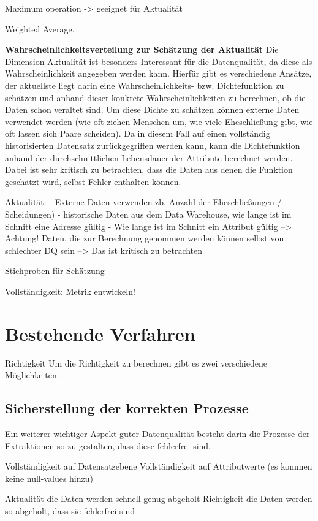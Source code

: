 Maximum operation
-> geeignet für Aktualität

Weighted Average. 

\textbf{Wahrscheinlichkeitsverteilung zur Schätzung der Aktualität}
Die Dimension Aktualität ist besonders Interessant für die Datenqualität, da diese als Wahrscheinlichkeit angegeben werden kann.
Hierfür gibt es verschiedene Ansätze, der aktuellste liegt darin eine Wahrscheinlichkeits- bzw. Dichtefunktion zu schätzen und anhand dieser konkrete Wahrscheinlichkeiten zu berechnen, ob die Daten schon veraltet sind.
Um diese Dichte zu schätzen können externe Daten verwendet werden (wie oft ziehen Menschen um, wie viele Eheschließung gibt, wie oft lassen sich Paare scheiden).
Da in diesem Fall auf einen vollständig historisierten Datensatz zurückgegriffen werden kann, kann die Dichtefunktion anhand der durchschnittlichen Lebensdauer der Attribute berechnet werden.
Dabei ist sehr kritisch zu betrachten, dass die Daten aus denen die Funktion geschätzt wird, selbst Fehler enthalten können. 

Aktualität:
- Externe Daten verwenden zb. Anzahl der Eheschließungen / Scheidungen) 
- historische Daten aus dem Data Warehouse, wie lange ist im Schnitt eine Adresse gültig
- Wie lange ist im Schnitt ein Attribut gültig
--> Achtung! Daten, die zur Berechnung genommen werden können selbst von schlechter DQ sein
--> Das ist kritisch zu betrachten


Stichproben für Schätzung


Vollständigkeit: Metrik entwickeln!


\section{Bestehende Verfahren}
Richtigkeit
Um die Richtigkeit zu berechnen gibt es zwei verschiedene Möglichkeiten. 


\subsection{Sicherstellung der korrekten Prozesse}
Ein weiterer wichtiger Aspekt guter Datenqualität besteht darin die Prozesse der Extraktionen so zu gestalten, dass diese fehlerfrei sind.

Vollständigkeit auf Datensatzebene
Vollständigkeit auf Attributwerte (es kommen keine null-values hinzu)


Aktualität die Daten werden schnell genug abgeholt
Richtigkeit die Daten werden so abgeholt, dass sie fehlerfrei sind

